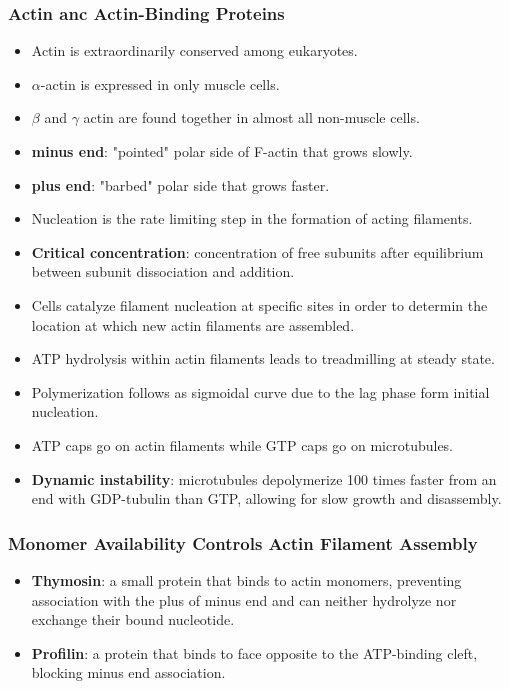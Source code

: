 \documentclass[12pt,a4paper]{article}
\begin{document}
\subsubsection{Actin anc Actin-Binding Proteins}
\begin{itemize}
    \item Actin is extraordinarily conserved among eukaryotes.
    \item $\alpha$-actin is expressed in only muscle cells.
    \item $\beta$ and $\gamma$ actin are found together in almost all non-muscle cells.
    \item \textbf{minus end}: "pointed" polar side of F-actin that grows slowly.
    \item \textbf{plus end}: "barbed" polar side that grows faster.
    \item Nucleation is the rate limiting step in the formation of acting filaments.
    \item \textbf{Critical concentration}: concentration of free subunits after equilibrium between subunit dissociation and addition.
    \item Cells catalyze filament nucleation at specific sites in order to determin the location at which new actin filaments are assembled.
    \item ATP hydrolysis within actin filaments leads to treadmilling at steady state.
    \item Polymerization follows as sigmoidal curve due to the lag phase form initial nucleation. 
    \item ATP caps go on actin filaments while GTP caps go on microtubules.
    \item \textbf{Dynamic instability}: microtubules depolymerize 100 times faster from an end with GDP-tubulin than GTP, allowing for slow growth and disassembly.
\end{itemize}

\subsubsection{Monomer Availability Controls Actin Filament Assembly}
\begin{itemize}
    \item \textbf{Thymosin}: a small protein that binds to actin monomers, preventing association with the plus of minus end and can neither hydrolyze nor exchange their bound nucleotide.
    \item \textbf{Profilin}: a protein that binds to face opposite to the ATP-binding cleft, blocking minus end association.
\end{itemize}
\end{document}
